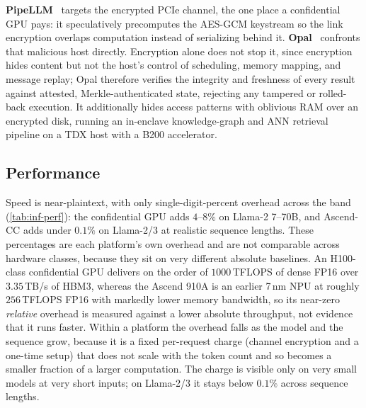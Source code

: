 \textbf{PipeLLM}~\citep{pipellm} targets the encrypted PCIe channel, the one place a confidential
GPU pays: it speculatively precomputes the AES-GCM keystream so the link encryption overlaps
computation instead of serializing behind it. \textbf{Opal}~\citep{kaviani_opal}
confronts that malicious host directly. Encryption alone does not stop it, since encryption hides
content but not the host's control of scheduling, memory mapping, and message replay; Opal
therefore verifies the integrity and freshness of every result against attested,
Merkle-authenticated state, rejecting any tampered or rolled-back execution. It additionally hides
access patterns with oblivious RAM over an encrypted disk, running an in-enclave knowledge-graph
and ANN retrieval pipeline on a TDX host with a B200 accelerator.

\subsection{Performance}
\label{ssec:tee-perf}
Speed is near-plaintext, with only single-digit-percent overhead across the band (\cref{tab:inf-perf}): the
confidential GPU adds $4$--$8\%$ on Llama-2 7--70B, and Ascend-CC adds under $0.1\%$ on Llama-2/3
at realistic sequence lengths. These percentages are each platform's own overhead and are not
comparable across hardware classes, because they sit on very different absolute baselines. An
H100-class confidential GPU delivers on the order of $1000$\,TFLOPS of dense FP16 over
$3.35$\,TB/s of HBM3, whereas the Ascend 910A is an earlier 7\,nm NPU at roughly $256$\,TFLOPS
FP16 with markedly lower memory bandwidth, so its near-zero \emph{relative} overhead is measured
against a lower absolute throughput, not evidence that it runs faster. Within a platform the
overhead falls as the model and the sequence grow, because it is a fixed per-request charge
(channel encryption and a one-time setup) that does not scale with the token count and so becomes
a smaller fraction of a larger computation. The charge is visible only on very small models at
very short inputs; on Llama-2/3 it stays below $0.1\%$ across sequence lengths.

